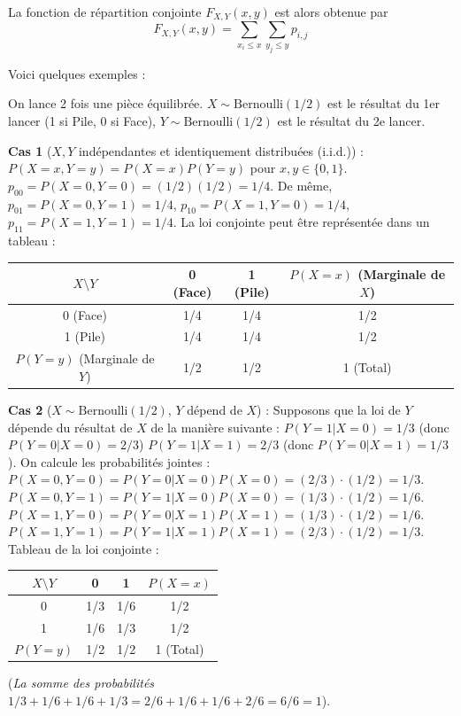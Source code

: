 \begin{definition}
    La fonction de répartition conjointe $F_{X,Y}(x,y)$ est alors obtenue par
    \[
    F_{X,Y}(x,y)=\sum_{x_i\leq x}\sum_{y_j\leq y}p_{i,j}
    \]
\end{definition}

Voici quelques exemples :

\begin{exemple} On lance 2 fois une pièce équilibrée. $X \sim \text{Bernoulli}(1/2)$ est le résultat du 1er lancer (1 si Pile, 0 si Face), $Y \sim \text{Bernoulli}(1/2)$ est le résultat du 2e lancer.

\vspace{1em}

\textbf{Cas 1} ($X, Y$ indépendantes et identiquement distribuées (i.i.d.)) : $P(X=x, Y=y) = P(X=x)P(Y=y)$ pour $x, y \in \{0, 1\}$. $p_{00} = P(X=0, Y=0) = (1/2)(1/2) = 1/4$. De même, $p_{01} = P(X=0, Y=1) = 1/4$, $p_{10} = P(X=1, Y=0) = 1/4$, $p_{11} = P(X=1, Y=1) = 1/4$. La loi conjointe peut être représentée dans un tableau :

\begin{center}
\renewcommand{\arraystretch}{1.5}
\begin{tabular}{c|cc|c}
$X \setminus Y$ & 0 (Face) & 1 (Pile) & $P(X=x)$ (Marginale de $X$) \\ \hline
0 (Face) & 1/4 & 1/4 & 1/2 \\
1 (Pile) & 1/4 & 1/4 & 1/2 \\ \hline
$P(Y=y)$ (Marginale de $Y$) & 1/2 & 1/2 & 1 (Total)
\end{tabular}
\end{center}

\vspace{1em}

\textbf{Cas 2} ($X \sim \text{Bernoulli}(1/2)$, $Y$ dépend de $X$) : Supposons que la loi de $Y$ dépende du résultat de $X$ de la manière suivante : $P(Y=1|X=0) = 1/3$ (donc $P(Y=0|X=0) = 2/3$) $P(Y=1|X=1) = 2/3$ (donc $P(Y=0|X=1) = 1/3$). On calcule les probabilités jointes :
$P(X=0, Y=0) = P(Y=0|X=0)P(X=0) = (2/3) \cdot (1/2) = 1/3$.
$P(X=0, Y=1) = P(Y=1|X=0)P(X=0) = (1/3) \cdot (1/2) = 1/6$.
$P(X=1, Y=0) = P(Y=0|X=1)P(X=1) = (1/3) \cdot (1/2) = 1/6$.
$P(X=1, Y=1) = P(Y=1|X=1)P(X=1) = (2/3) \cdot (1/2) = 1/3$.
Tableau de la loi conjointe :

\begin{center}
\renewcommand{\arraystretch}{1.5}
\begin{tabular}{c|cc|c}
$X \setminus Y$ & 0 & 1 & $P(X=x)$ \\ \hline
0 & 1/3 & 1/6 & 1/2 \\
1 & 1/6 & 1/3 & 1/2 \\ \hline
$P(Y=y)$ & 1/2 & 1/2 & 1 (Total)
\end{tabular}
\end{center}

(\textit{La somme des probabilités $1/3 + 1/6 + 1/6 + 1/3 = 2/6 + 1/6 + 1/6 + 2/6 = 6/6 = 1$}).
    
\end{exemple}

